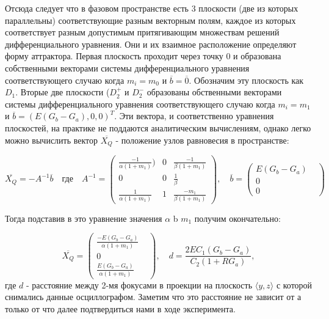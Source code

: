 \documentclass[12pt]{article}
\begin{document}
Отсюда следует что в фазовом пространстве есть 3 плоскости (две из которых параллельны) соответствующие разным  векторным полям, каждое из которых соответствует разным  допустимым притягивающим множествам решений дифференциального уравнения. Они и их взаимное расположение определяют  форму аттрактора. Первая плоскость проходит через точку 0 и образована собственными векторами системы дифференциального уравнения соответствующего случаю когда $m_i = m_0$ и $\overline{b} = \overline{0}$. Обозначим эту плоскость как $D_1$. Вторые две плоскости ($D_2^+$ и $D_2^-$ образованы  обственными векторами системы дифференциального уравнения соответствующего случаю когда $m_i = m_1$ и $\overline{b} = ( E(G_b - G_a),  0,  0)^{T}$. Эти вектора, и соответственно уравнения плоскостей, на практике не поддаются аналитическим вычислениям, однако легко можно вычислить вектор $\overline{X_Q}$  - положение узлов равновесия в пространстве:



\begin{equation}
	\overline{X_Q} = -A^{-1}\overline{b}
	\quad \textit{где} \quad A^{-1}=
	\begin{pmatrix}
		\frac{-1}{\alpha(1+m_{1})}) & 0 & \frac{-1}{\beta(1+m_1)}   \\
		0                           & 0 & \frac{1}{\beta}           \\
		\frac{1}{\alpha(1+m_1)}     & 1 & \frac{-m_1}{\beta(1+m_1)}
	\end{pmatrix},
	\quad \overline{b} =
	\begin{pmatrix}
		E(G_b - G_a) \\
		0 &          \\
		0 &
	\end{pmatrix}
\end{equation}

Тогда подставив в это уравнение значения $\alpha$ b $m_1$ получим окончательно:

\begin{equation}
	\overline{X_Q}=
	\begin{pmatrix}
		\frac{-E(G_b-G_a)}{\alpha(1+m_{1})} \\
		0 &                                  \\
		\frac{E(G_b-G_a)}{\alpha(1+m_1)}
	\end{pmatrix}, \quad d = \frac{2EC_1(G_b -G_a)}{C_2(1+RG_a)},
\end{equation}
где $d$ - расстояние между 2-мя фокусами в проекции на плоскость $\langle y,z \rangle $ с которой снимались данные осциллографом. Заметим что это расстояние не зависит от а только от что далее подтвердиться нами в ходе эксперимента.
\end{document}
